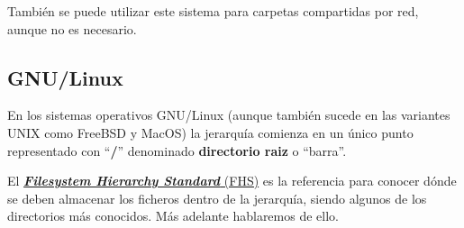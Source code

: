 También se puede utilizar este sistema para carpetas compartidas por red, aunque no es necesario.

\subsection{GNU/Linux}
En los sistemas operativos GNU/Linux (aunque también sucede en las variantes UNIX como FreeBSD y MacOS) la jerarquía comienza en un único punto representado con “\textbf{/}” denominado \textbf{directorio raiz} o “barra”.

El \href{https://es.wikipedia.org/wiki/Filesystem_Hierarchy_Standard}{\textbf{\textit{Filesystem Hierarchy Standard}} (FHS)} es la referencia para conocer dónde se deben almacenar los ficheros dentro de la jerarquía, siendo algunos de los directorios más conocidos. Más adelante hablaremos de ello.